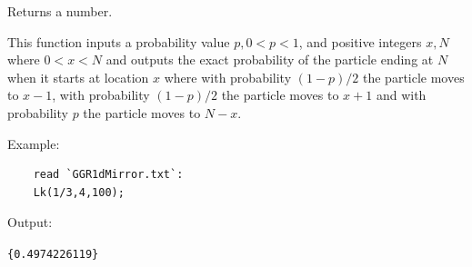 \documentclass[reqno]{amsart}
\theoremstyle{definition}
\theoremstyle{definition}
\theoremstyle{remark}
\begin{document}
\begin{itemize}
    Returns a number.
    
    This function inputs a probability value $p, 0<p<1$, and positive integers $x,N$ where $0<x<N$ and outputs the exact probability of the particle ending at $N$ when it starts at location $x$ where with probability $(1-p)/2$ the particle moves to $x-1$, with probability $(1-p)/2$ the particle moves to $x+1$ and with probability $p$ the particle moves to $N-x$.

    Example:
    
    \begin{lstlisting}
    read `GGR1dMirror.txt`:
    Lk(1/3,4,100);
    \end{lstlisting}
    Output:
    
    \lstinline!{0.4974226119}!
    
\end{itemize}
\end{document}
